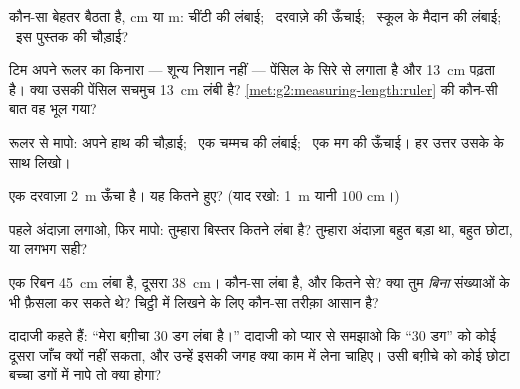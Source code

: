 \begin{exercise}[$\star$]\label{exo:g2:measuring-length:4}
कौन-सा  बेहतर बैठता है, \unit{cm} या \unit{m}: चींटी की
लंबाई; \ दरवाज़े की ऊँचाई; \ स्कूल के मैदान की लंबाई; \ इस पुस्तक की
चौड़ाई?
\end{exercise}

\begin{exercise}[$\star$]\label{exo:g2:measuring-length:5}
टिम अपने रूलर का किनारा --- शून्य निशान नहीं --- पेंसिल के सिरे से
लगाता है और \qty{13}{cm} पढ़ता है। क्या उसकी पेंसिल सचमुच
\qty{13}{cm} लंबी है? \cref{met:g2:measuring-length:ruler} की कौन-सी
बात वह भूल गया?
\end{exercise}

\begin{exercise}[$\star$]\label{exo:g2:measuring-length:6}
रूलर से मापो: अपने हाथ की चौड़ाई; \ एक चम्मच की लंबाई; \ एक मग की
ऊँचाई। हर उत्तर उसके  के साथ लिखो।
\end{exercise}

\begin{exercise}[$\star$]\label{exo:g2:measuring-length:7}
एक दरवाज़ा \qty{2}{m} ऊँचा है। यह कितने  हुए? (याद रखो:
\qty{1}{m} यानी $100$ \unit{cm}।)
\end{exercise}

\begin{exercise}[$\star$]\label{exo:g2:measuring-length:8}
पहले अंदाज़ा लगाओ, फिर मापो: तुम्हारा बिस्तर कितने  लंबा है? तुम्हारा
अंदाज़ा बहुत बड़ा था, बहुत छोटा, या लगभग सही?
\end{exercise}

\begin{exercise}[$\star\star$]\label{exo:g2:measuring-length:9}
एक रिबन \qty{45}{cm} लंबा है, दूसरा \qty{38}{cm}। कौन-सा लंबा है,
और कितने  से? क्या तुम \emph{बिना} संख्याओं के भी फ़ैसला कर
सकते थे? चिट्ठी में लिखने के लिए कौन-सा तरीक़ा आसान है?
\end{exercise}

\begin{exercise}[$\star\star$]\label{exo:g2:measuring-length:10}
दादाजी कहते हैं: ``मेरा बग़ीचा $30$ डग लंबा है।'' दादाजी को प्यार से
समझाओ कि ``$30$ डग'' को कोई दूसरा जाँच क्यों नहीं सकता, और उन्हें
इसकी जगह क्या काम में लेना चाहिए। उसी बग़ीचे को कोई छोटा बच्चा डगों
में नापे तो क्या होगा?
\end{exercise}
